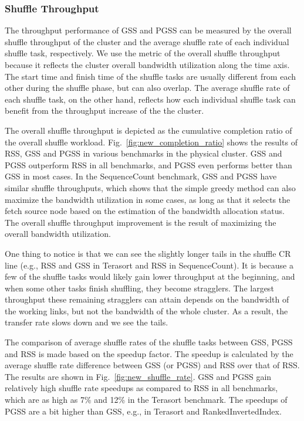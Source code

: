 \documentclass[10pt,journal,compsoc]{IEEEtran}
\begin{document}
\subsubsection{Shuffle Throughput}
The throughput performance of GSS and PGSS can be measured by the overall shuffle
throughput of the cluster
and the average shuffle rate of each individual shuffle task, respectively. 
We use the metric of the overall shuffle throughput because it
reflects the cluster overall bandwidth utilization along the time axis.
The start time and finish time of the shuffle tasks are usually different from each other during the shuffle phase, but can also overlap. 
The average shuffle rate of each shuffle task, on the other hand, reflects how each individual shuffle task can benefit from the throughput increase of the the cluster.

The overall shuffle throughput is depicted as the cumulative
completion ratio of the overall shuffle workload.
Fig.~\ref{fig:new_completion_ratio} shows the results of RSS, GSS
and PGSS in various benchmarks in the physical cluster.
GSS and PGSS outperform RSS in all benchmarks, 
and PGSS even performs better than GSS in most cases. 
In the SequenceCount benchmark, GSS and PGSS have similar shuffle
throughputs, %
which shows that the simple greedy method can also maximize the
bandwidth utilization in some cases,
as long as that it selects the fetch source node based on the estimation of the bandwidth allocation status. 
The overall shuffle throughput improvement is the result of maximizing
the overall bandwidth utilization.

One thing to notice is that we can see the slightly longer tails in the shuffle CR line (e.g., RSS and GSS in Terasort and RSS in SequenceCount). 
It is because a few of the shuffle tasks would likely gain lower throughput at the beginning, and when some other tasks finish shuffling, they become stragglers. The largest throughput these remaining stragglers can attain depends on the bandwidth of the working links, but not the bandwidth of the whole cluster. As a result, the transfer rate slows down and we see the tails.

The comparison of average shuffle rates of the shuffle tasks between GSS, PGSS and RSS is made based on the speedup factor. 
The speedup is calculated by the average shuffle rate difference between GSS (or PGSS) and RSS over that of RSS. 
The results are shown in Fig.~\ref{fig:new_shuffle_rate}.
GSS and PGSS gain relatively high shuffle rate speedups as compared to
RSS in all benchmarks, which are as high as 7\% and 12\% in the
Terasort benchmark.
The speedups of PGSS are a bit higher than GSS, e.g., in Terasort and RankedInvertedIndex. 
\end{document}
